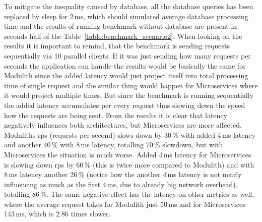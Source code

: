To mitigate the inequality caused by database, all the database queries has been replaced by sleep for 2\,ms, which should simulated average database processing time and the results of running benchmark without database are present in seconds half of the Table~\ref{table:benchmark_scenario2}. When looking on the results it is important to remind, that the benchmark is sending requests sequentially via 10 parallel clients. If it was just sending how many requests per seconds the application can handle the results would be basically the same for Modulith since the added latency would just project itself into total processing time of single request and the similar thing would happen for Microservices where it would project multiple times. But since the benchmark is running sequentially the added latency accumulates per every request thus slowing down the speed how the requests are being sent. From the results it is clear that latency negatively influences both architectures, but Microservices are more affected. Moduliths rps (requests per second) slows down by 30\,\% with added 4\,ms latency and another 40\,\% with 8\,ms latency, totalling 70\,\% slowdown, but with Microservices the situation is much worse. Added 4\,ms latency for Microservices is slowing down rps by 60\,\% (this is twice more compared to Modulith) and with 8\,ms latency another 26\,\% (notice how the another 4\,ms latency is not nearly influencing as much as the first 4\,ms, due to already big network overhead), totalling 86\,\%. The same negative effect has the latency on other metrics as well, where the average request takes for Modulith just 50\,ms and for Microservices 143\,ms, which is 2.86 times slower.



